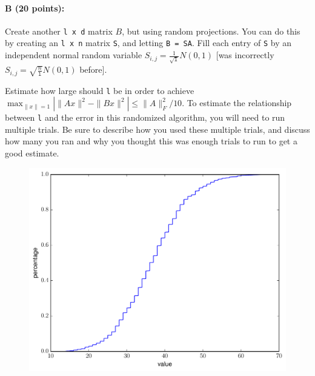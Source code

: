 \documentclass[11pt]{article}
\begin{document}

\paragraph{B (20 points):}
Create another \texttt{l x d} matrix $B$, but using random projections.  You can do this by creating an \texttt{l x n} matrix \texttt{S}, and letting \texttt{B = SA}.  Fill each entry of \texttt{S} by an independent normal random variable {\color{red} $S_{i,j} = \frac{1}{\sqrt{\texttt{l}}} N(0,1)$}  {\color{blue} [was incorrectly $S_{i,j} = \sqrt{\frac{n}{\texttt{l}}} N(0,1)$ before]}.  

Estimate how large should \texttt{l} be in order to achieve $\max_{\|x\|=1} | \|A x\|^2 - \|B x\|^2 | \leq \|A\|_F^2/10$.  To estimate the relationship between \texttt{l} and the error in this randomized algorithm, you will need to run multiple trials.  Be sure to describe how you used these multiple trials, and discuss how many you ran and why you thought this was enough trials to run to get a good estimate.  

\begin{figure}[H]
\centering
\includegraphics[width=.75\textwidth]{prob2b.pdf}
\end{figure}
\end{document}
